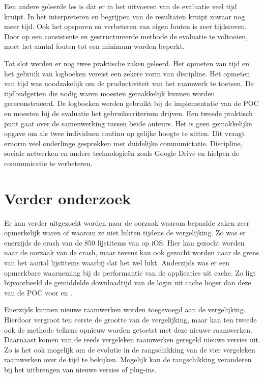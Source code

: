 Een andere geleerde les is dat er in het uitvoeren van de evaluatie veel tijd kruipt.
In het interpreteren en begrijpen van de resultaten kruipt zowaar nog meer tijd.
Ook het opsporen en verbeteren van eigen fouten is zeer tijdsroven.
Door op een consistente en gestructureerde methode de evaluatie te voltooien, moet het aantal fouten tot een minimum worden beperkt.

Tot slot werden er nog twee praktische zaken geleerd.
Het opmeten van tijd en het gebruik van logboeken vereist een zekere vorm van discipline.
Het opmeten van tijd was noodzakelijk om de productiviteit van het raamwerk te toetsen.
De tijdbudgetten die nodig waren moesten gemakkelijk kunnen worden gereconstrueerd.
De logboeken werden gebruikt bij de implementatie van de POC en moesten bij de evaluatie het gebruikscriterium drijven.
Een tweede praktisch punt gaat over de samenwerking tussen beide auteurs.
Het is geen gemakkelijke opgave om als twee individuen continu op gelijke hoogte te zitten.
Dit vraagt ernorm veel onderlinge gesprekken met duidelijke communictatie.
Discipline, sociale netwerken en andere technologieën zoals Google Drive en \gh{} hielpen de communicatie te verbeteren.

\section{Verder onderzoek} %
Er kan verder uitgezocht worden naar de oorzaak waarom bepaalde zaken zeer opmerkelijk waren of waarom ze niet lukten tijdens de vergelijking.
Zo was er enerzijds de crash van de 850 lijstitems van \kendo{} op iOS.
Hier kan gezocht worden naar de oorzaak van de crash, maar tevens kan ook gezocht worden naar de grens van het aantal lijstitems waarbij dat het wel lukt.
Anderzijds was er een opmerkbare waarneming bij de performantie van de applicaties uit cache. 
Zo ligt bijvoorbeeld de gemiddelde downloadtijd van de login uit cache hoger dan deze van de POC voor \jqm{} en \lungo{}. 

Enerzijds kunnen nieuwe raamwerken worden toegevoegd aan de vergelijking.
Hierdoor vergroot ten eerste de grootte van de vergelijking, maar kan ten tweede ook de methode telkens opnieuw worden getoetst met deze nieuwe raamwerken.
Daarnaast komen van de reeds vergeleken raamwerken geregeld nieuwe versies uit.
Zo is het ook mogelijk om de evolutie in de rangschikking van de vier vergeleken raamwerken over de tijd te bekijken.
Mogelijk kan de rangschikking veranderen bij het uitbrengen van nieuwe versies of plug-ins.

